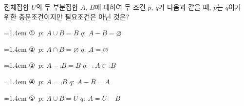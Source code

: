 전체집합 $U$의 두 부분집합 $A$, $B$에 대하여 두 조건 $p$, $q$가 다음과 같을 때, $p$는 $q$이기 위한 충분조건이지만 필요조건은 아닌 것은?
\par\medskip\par\noindent\hangindent=1.4em {\small ①}\ $p:\ A\cup B=B$ \quad $q:\ A-B=\varnothing$\par\noindent\hangindent=1.4em {\small ②}\ $p:\ A\cap B=\varnothing$ \quad $q:\ A=\varnothing$\par\noindent\hangindent=1.4em {\small ③}\ $p:\ A-\comp{B}=B$ \quad $q:\ \comp{A}\subset\comp{B}$\par\noindent\hangindent=1.4em {\small ④}\ $p:\ A=\comp{B}$ \quad $q:\ A-B=A$\par\noindent\hangindent=1.4em {\small ⑤}\ $p:\ A\cup B=U$ \quad $q:\ A=U-B$\par\medskip
